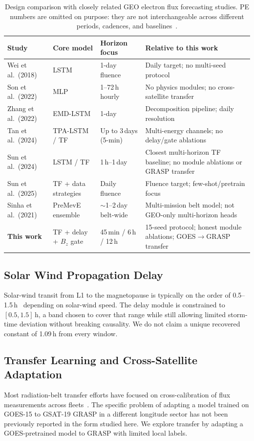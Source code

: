 ﻿\documentclass{ieeeaccess}
\begin{document}
\begin{table}[!htbp]
\centering
\caption{Design comparison with closely related GEO electron flux forecasting studies.
PE numbers are omitted on purpose: they are not interchangeable across different
periods, cadences, and baselines~\cite{b21,b22}.}
\label{tab:compare}
\begin{tabular}{@{}lp{2.0cm}p{2.3cm}p{4.0cm}@{}}
\toprule
\textbf{Study} & \textbf{Core model} & \textbf{Horizon focus} & \textbf{Relative to this work} \\
\midrule
Wei et al.\ (2018) & LSTM & 1-day fluence & Daily target; no multi-seed protocol \\
Son et al.\ (2022) & MLP & 1--72\,h hourly & No physics modules; no cross-satellite transfer \\
Zhang et al.\ (2022) & EMD-LSTM & 1-day & Decomposition pipeline; daily resolution \\
Tan et al.\ (2024) & TPA-LSTM / TF & Up to 3\,days (5-min) & Multi-energy channels; no delay/gate ablations \\
Sun et al.\ (2024) & LSTM / TF & 1\,h--1\,day & Closest multi-horizon TF baseline; no module ablations or GRASP transfer \\
Sun et al.\ (2025) & TF + data strategies & Daily fluence & Fluence target; few-shot/pretrain focus \\
Sinha et al.\ (2021) & PreMevE ensemble & $\sim$1--2\,day belt-wide & Multi-mission belt model; not GEO-only multi-horizon heads \\
\textbf{This work} & TF + delay + \(B_z\) gate & 45\,min / 6\,h / 12\,h & 15-seed protocol; honest module ablations; GOES$\rightarrow$GRASP transfer \\
\bottomrule
\end{tabular}
\end{table}

\subsection{Solar Wind Propagation Delay}
Solar-wind transit from L1 to the magnetopause is typically on the order of 0.5--1.5\,h~\cite{b28} depending on solar-wind speed. The delay module is constrained to \([0.5, 1.5]\,\mathrm{h}\), a band chosen to cover that range while still allowing limited storm-time deviation without breaking causality. We do not claim a unique recovered constant of 1.09\,h from every window.

\subsection{Transfer Learning and Cross-Satellite Adaptation}
Most radiation-belt transfer efforts have focused on cross-calibration of flux
measurements across fleets~\cite{b25}. The specific problem of adapting a model
trained on GOES-15 to GSAT-19 GRASP in a different longitude sector has not been
previously reported in the form studied here. We explore transfer by adapting
a GOES-pretrained model to GRASP with limited local labels.
\end{document}

